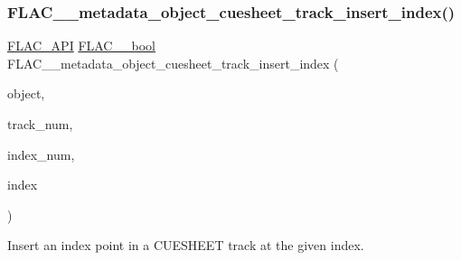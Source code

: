 \subsubsection{\texorpdfstring{FLAC\_\_metadata\_object\_cuesheet\_track\_insert\_index()}{FLAC\_\_metadata\_object\_cuesheet\_track\_insert\_index()}}
{\footnotesize\ttfamily \mbox{\hyperlink{group__flac__export_ga56ca07df8a23310707732b1c0007d6f5}{F\+L\+A\+C\+\_\+\+A\+PI}} \mbox{\hyperlink{ordinals_8h_a95103469f1cbd78b8cf250194985b34e}{F\+L\+A\+C\+\_\+\+\_\+bool}} F\+L\+A\+C\+\_\+\+\_\+metadata\+\_\+object\+\_\+cuesheet\+\_\+track\+\_\+insert\+\_\+index (\begin{DoxyParamCaption}\item[{\mbox{\hyperlink{struct_f_l_a_c_____stream_metadata}{F\+L\+A\+C\+\_\+\+\_\+\+Stream\+Metadata}} $\ast$}]{object,  }\item[{unsigned}]{track\+\_\+num,  }\item[{unsigned}]{index\+\_\+num,  }\item[{\mbox{\hyperlink{struct_f_l_a_c_____stream_metadata___cue_sheet___index}{F\+L\+A\+C\+\_\+\+\_\+\+Stream\+Metadata\+\_\+\+Cue\+Sheet\+\_\+\+Index}}}]{index }\end{DoxyParamCaption})}

Insert an index point in a C\+U\+E\+S\+H\+E\+ET track at the given index.


